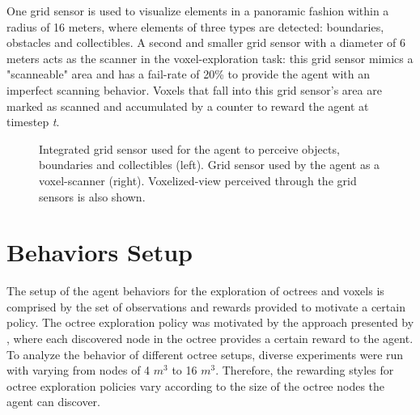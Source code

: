 One grid sensor is used to visualize elements in a panoramic fashion within a radius of 16 meters, where elements of three types are detected: boundaries, obstacles and collectibles.
A second and smaller grid sensor with a diameter of 6 meters acts as the scanner in the voxel-exploration task: this grid sensor mimics a "scanneable" area and has a fail-rate of 20\% to provide the agent with an imperfect scanning behavior. Voxels that fall into this grid sensor's area are marked as scanned and accumulated by a counter to reward the agent at timestep \textit{t}. 

\begin{figure}[!ht]
    \centering
    \caption{Integrated grid sensor used for the agent to perceive objects, boundaries and collectibles (left). Grid sensor used by the agent as a voxel-scanner (right). Voxelized-view perceived through the grid sensors is also shown.}
    \label{fig:unity-island-gridsensors}
\end{figure}

 
\section{Behaviors Setup}\label{chap:4:behaviors}

The setup of the agent behaviors for the exploration of octrees and voxels is comprised by the set of observations and rewards provided to motivate a certain policy. The octree exploration policy was motivated by the approach presented by \textcite{chen2019learning}, where each discovered node in the octree provides a certain reward to the agent. To analyze the behavior of different octree setups, diverse experiments were run with varying from nodes of 4 $m^3$ to 16 $m^3$. Therefore, the rewarding styles for octree exploration policies vary according to the size of the octree nodes the agent can discover.


